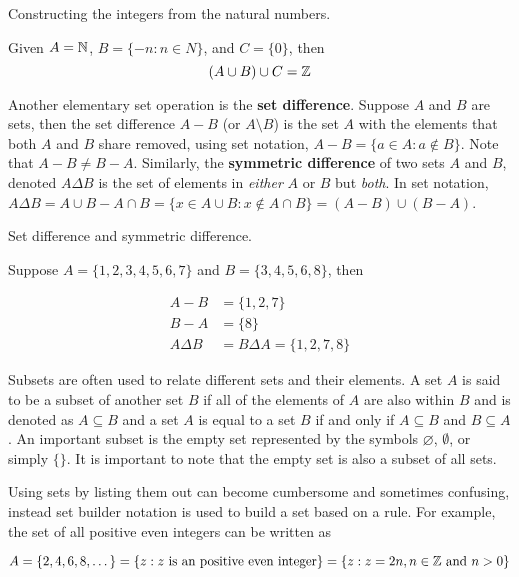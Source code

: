 \begin{example} Constructing the integers from the natural numbers.

    Given $A = \mathbb{N}$, $B = \{-n : n \in N\}$, and $C = \{0\}$, then
    $$
    (A \cup B) \cup C = \mathbb{Z}
    $$
\end{example}

Another elementary set operation is the \textbf{set difference}. Suppose $A$ and $B$ are sets, then the set difference $A - B$ (or $A \setminus B$) is the set $A$ with the elements that both $A$ and $B$ share removed, using set notation, $A - B = \{a \in A : a \not\in B\}$. Note that $A - B \neq B - A$. Similarly, the \textbf{symmetric difference} of two sets $A$ and $B$, denoted $A\Delta B$ is the set of elements in \textit{either} $A$ or $B$ but \textit{both}. In set notation, $A\Delta B = A \cup B - A \cap B = \{x \in A \cup B : x \not\in A \cap B\} = (A - B) \cup (B - A)$.

\begin{example} Set difference and symmetric difference.

    Suppose $A = \{1,2,3,4,5,6,7\}$ and $B = \{3,4,5,6,8\}$, then

    $$
    \begin{aligned}
        A - B &= \{1,2,7\} \\
        B - A &= \{8\} \\
        A \Delta B &= B \Delta A = \{1,2,7,8\}
    \end{aligned}
    $$
\end{example}

Subsets are often used to relate different sets and their elements. A set $A$ is said to be a subset of another set $B$ if all of the elements of $A$ are also within $B$ and is denoted as $A \subseteq B$ and a set $A$ is equal to a set $B$ if and only if $A \subseteq B$ and $B \subseteq A$. An important subset is the empty set represented by the symbols $\varnothing$, $\emptyset$, or simply $\{\}$. It is important to note that the empty set is also a subset of all sets.

\medskip

Using sets by listing them out can become cumbersome and sometimes confusing, instead set builder notation is used to build a set based on a rule. For example, the set of all positive even integers can be written as

\begin{equation}
    A = \{2,4,6,8,\dots\} = \{z : z \text{ is an positive even integer}\} = \{z : z = 2n, n\in\mathbb{Z} \text{ and } n > 0\}
\end{equation}

